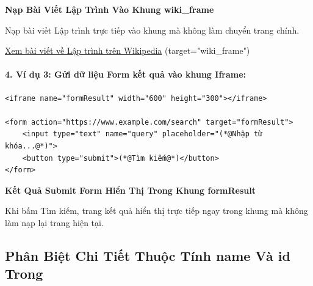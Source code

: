 \begin{browserWindow}[https://vi.wikipedia.org/wiki/Lap\_trinh (name="wiki\_frame")]
\centering\sffamily\vspace{4pt}
{\bfseries\color{primaryBlue}\large Nạp Bài Viết Lập Trình Vào Khung wiki\_frame} \par\vspace{6pt}
{\small\color{darkText} Nạp bài viết Lập trình trực tiếp vào khung mà không làm chuyển trang chính.} \par\vspace{4pt}
\textcolor{primaryBlue}{\underline{Xem bài viết về Lập trình trên Wikipedia}} \quad \small\textcolor{codeComment}{(target="wiki\_frame")} \par\vspace{4pt}
\end{browserWindow}

\paragraph{4. Ví dụ 3: Gửi dữ liệu Form kết quả vào khung Iframe:}
\begin{codeWindow}
\begin{lstlisting}[language=HTML5]
<iframe name="formResult" width="600" height="300"></iframe>

<form action="https://www.example.com/search" target="formResult">
    <input type="text" name="query" placeholder="(*@Nhập từ khóa...@*)">
    <button type="submit">(*@Tìm kiếm@*)</button>
</form>
\end{lstlisting}
\end{codeWindow}

\begin{browserWindow}[https://www.example.com/search?query=HTML5 (name="formResult")]
\centering\sffamily\vspace{4pt}
{\bfseries\color{secondaryTeal}\large Kết Quả Submit Form Hiển Thị Trong Khung formResult} \par\vspace{6pt}
{\small\color{darkText} Khi bấm Tìm kiếm, trang kết quả hiển thị trực tiếp ngay trong khung mà không làm nạp lại trang hiện tại.} \par\vspace{4pt}
\end{browserWindow}

\subsection{Phân Biệt Chi Tiết Thuộc Tính name Và id Trong }

